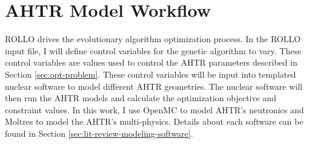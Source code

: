 \section{AHTR Model Workflow}
\gls{ROLLO} drives the evolutionary algorithm optimization process. 
In the \gls{ROLLO} input file, I will define control variables for the genetic algorithm 
to vary. 
These control variables are values used to control the \gls{AHTR} parameters described in 
Section \ref{sec:opt-problem}.
These control variables will be input into templated nuclear software to model different 
AHTR geometries.
The nuclear software will then run the \gls{AHTR} models and calculate the optimization 
objective and constraint values. 
In this work, I use OpenMC \cite{romano_openmc:_2015} to model \gls{AHTR}'s neutronics 
and Moltres \cite{lindsay_introduction_2018} to model the \gls{AHTR}'s multi-physics. 
Details about each software can be found in Section \ref{sec:lit-review-modeling-software}.

